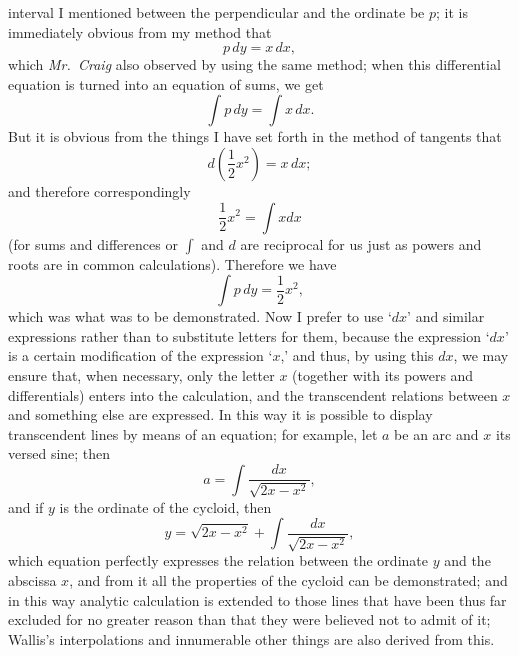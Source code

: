 \documentclass[twoside,openright]{article}
\begin{document}
interval I mentioned between the perpendicular and the ordinate be $p$; it is
immediately obvious from my method that 
$$p\,dy = x\,dx,$$
which   {\em
Mr.\ Craig} also observed by using the same method; when this differential
equation is turned into an equation of sums, we get 
$$\int\!p\,dy = \int\!x\,dx.$$
 But  it is obvious from the things I have set forth in the method
of tangents that 
$$d\left(\frac{1}{2}x^2\right) = x\,dx;$$
 and therefore correspondingly
$$\frac{1}{2}x^2 = \int\!xdx$$ 
(for sums and differences or $\int$ and $d$ are reciprocal for us just
as powers and roots are in common calculations). Therefore we have
$$\int\!p\,dy = \frac{1}{2}x^2,$$
which was what was to be demonstrated.  Now I prefer to use `$dx$' and
similar expressions rather than to substitute letters for them,
because the expression `$dx$' is a certain modification of the
expression `$x$,' and thus, by using this $dx$, we may ensure that,
when necessary, only the letter $x$ (together with its powers and
differentials) enters into the calculation, and the transcendent
relations between $x$ and something else are expressed.  In this way
it is possible to display transcendent lines by means of an equation;
for example, let $a$ be an arc and $x$ its versed sine; then
 $$a = \int \!\frac{dx}{\sqrt{2x-x^2}},$$\label{lcircarc} \hspace{-.65em} and if $y$ is
the ordinate of the cycloid, then
 $$y = \sqrt{2x-x^2} +
 \int \!\frac{dx}{\sqrt{2x-x^2}},$$ which equation perfectly expresses
 the relation between the ordinate $y$ and the abscissa $x$, and from
 it all the properties of the cycloid can be demonstrated; and in this
 way analytic calculation is extended to those lines that have been
 thus far excluded for no greater reason than that they were believed
 not to admit of it; Wallis's interpolations and innumerable other
 things are also derived from this.
\end{document}

